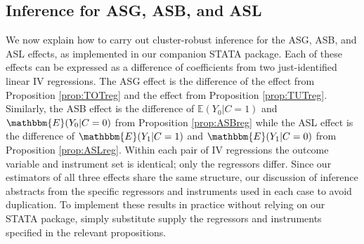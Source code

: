 \subsection{Inference for ASG, ASB, and ASL}
\label{subsec:inference}
We now explain how to carry out cluster-robust inference for the ASG, ASB, and ASL effects, as implemented in our companion STATA package.
Each of these effects can be expressed as a difference of coefficients from two just-identified linear IV regressions.
The ASG effect is the difference of the  effect from Proposition \ref{prop:TOTreg} and the  effect from Proposition \ref{prop:TUTreg}.
Similarly, the ASB effect is the difference of $\mathbb{E}(Y_0|C=1)$ and $\mathbbm{E}(Y_0|C=0)$ from Proposition \ref{prop:ASBreg} while the ASL effect is the difference of $\mathbbm{E}(Y_1|C=1)$ and $\mathbbm{E}(Y_1|C=0)$ from Proposition \ref{prop:ASLreg}.
Within each pair of IV regressions the outcome variable and instrument set is identical; only the regressors differ. 
Since our estimators of all three effects share the same structure, our discussion of inference abstracts from the specific regressors and instruments used in each case to avoid duplication. 
To implement these results in practice without relying on our STATA package, simply substitute supply the regressors and instruments specified in the relevant propositions. 

